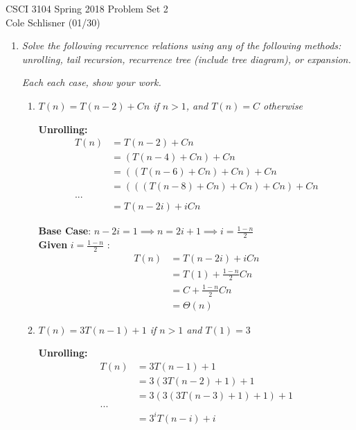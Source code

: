 \documentclass[12pt]{article} \setlength{\oddsidemargin}{0in}
\begin{document}
CSCI 3104 Spring 2018 \hfill Problem Set 2\\
Cole Schlisner (01/30)

\hrulefill

\begin{enumerate}

\item \textit{Solve the following recurrence relations using any of
    the following methods: unrolling, tail recursion, recurrence tree
    (include tree diagram), or expansion.}

  \textit{Each each case, show your work.}
  
  \begin{enumerate}
  \item \textit{$T(n)=T(n-2)+Cn$ if $n>1$, and $T(n)=C$ otherwise}
    
    \textbf{Unrolling:} \\

    \begin{align}
    T(n) &= T(n-2) + Cn \\
    &= (T(n-4) + Cn) + Cn \\
    &= ((T(n-6) + Cn) + Cn) + Cn \\
    &= (((T(n-8) + Cn) + Cn) + Cn) + Cn \\
    ... \\
    &= T(n-2i) + iCn
    \end{align}

    \textbf{Base Case}: $n-2i = 1 \implies n = 2i+1 \implies i = \frac{1-n}{2}$ \\
    \medskip
    \textbf{Given} $i = \frac{1-n}{2}$ : \\
    \begin{align}
    T(n) &= T(n-2i) + iCn \\
    &= T(1) + \frac{1-n}{2}Cn \\
    &= C + \frac{1-n}{2}Cn \\
    &= \Theta(n)
    \end{align}
  
  \newpage 

  \item \textit{$T(n)=3T(n-1)+1$ if $n>1$ and $T(1)=3$}

    \textbf{Unrolling:} \\

    \begin{align}
      T(n) &= 3T(n-1) + 1 \\
      &= 3(3T(n-2) + 1) + 1 \\
      &= 3(3(3T(n-3) + 1) + 1) + 1 \\
      ... \\
      &= 3^iT(n-i) + i
    \end{align}


\end{enumerate}
\end{enumerate}
\end{document}
